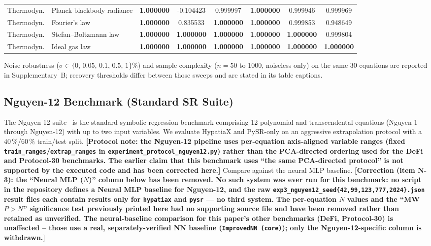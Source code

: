 \documentclass[twoside,11pt]{article}
\begin{document}
{\begin{longtable}{p{1.9cm}p{4.3cm}cccccc}
Thermodyn. & Planck blackbody radiance & \textbf{1.000000} & -0.104423 & 0.999997 & \textbf{1.000000} & 0.999946 & 0.999969 \\
Thermodyn. & Fourier's law & \textbf{1.000000} & 0.835533 & \textbf{1.000000} & \textbf{1.000000} & 0.999853 & 0.948649 \\
Thermodyn. & Stefan--Boltzmann law & \textbf{1.000000} & \textbf{1.000000} & \textbf{1.000000} & \textbf{1.000000} & \textbf{1.000000} & 0.999804 \\
Thermodyn. & Ideal gas law & \textbf{1.000000} & \textbf{1.000000} & \textbf{1.000000} & \textbf{1.000000} & \textbf{1.000000} & \textbf{1.000000} \\
\bottomrule
\end{longtable}}

Noise robustness ($\sigma \in \{0,\,0.05,\,0.1,\,0.5,\,1\}\%$) and sample complexity ($n=50$ to $1000$, noiseless only) on the same 30 equations are reported in Supplementary~B; recovery thresholds differ between those sweeps and are stated in its table captions.

\subsection{Nguyen-12 Benchmark (Standard SR Suite)}\label{subsec:nguyen12-benchmark-standard-sr-suite}
\label{sec:nguyen12}

The Nguyen-12 suite~\citep{uy2011semantically} is the standard symbolic-regression
benchmark comprising 12 polynomial and transcendental equations (Nguyen-1 through
Nguyen-12) with up to two input variables.  We evaluate HypatiaX and PySR-only on
an aggressive extrapolation protocol with a 40\,\%/60\,\% train/test split.
\textbf{[Protocol note: the Nguyen-12 pipeline uses per-equation axis-aligned
variable ranges (fixed \texttt{train\_ranges}/\texttt{extrap\_ranges} in
\texttt{experiment\_protocol\_nguyen12.py}) rather than the PCA-directed
ordering used for the DeFi and Protocol-30 benchmarks.  The earlier claim that
this benchmark uses ``the same PCA-directed protocol'' is not supported by
the executed code and has been corrected here.]}
Compare against the neural MLP baseline. \textbf{[Correction (item N-3):
the ``Neural MLP ($N$)'' column below has been removed. No such system
was ever run for this benchmark: no script in the repository defines a
Neural MLP baseline for Nguyen-12, and the raw
\texttt{exp3\_nguyen12\_seed\{42,99,123,777,2024\}.json} result files each
contain results only for \texttt{hypatiax} and \texttt{pysr} --- no third
system. The per-equation $N$ values and the ``MW $P{>}N$'' significance
test previously printed here had no supporting source file and have been
removed rather than retained as unverified. The neural-baseline comparison
for this paper's other benchmarks (DeFi, Protocol-30) is unaffected --
those use a real, separately-verified NN baseline
(\texttt{ImprovedNN (core)}); only the Nguyen-12-specific column is
withdrawn.]}
\end{document}

